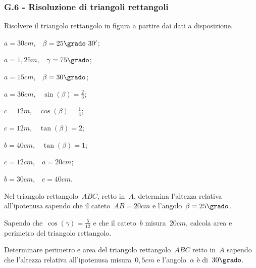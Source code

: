 \subsubsection*{G.6 - Risoluzione di triangoli rettangoli}

\begin{esercizio}
\label{ese:G.7}%
Risolvere il triangolo rettangolo in figura a partire dai dati a disposizione.
\begin{multicols}{2}
\begin{center}
 
\end{center}
\begin{enumeratea}
 \item $a=30\unit{cm}$,$\quad\beta=25\grado~30'$;
 \item $a=1,25\unit{m}$,$\quad\gamma=75\grado$;
 \item $a=15\unit{cm}$,$\quad\beta=30\grado$;
 \item $a=36\unit{cm}$,$\quad\sin(\beta)=\frac{2}{3}$;
 \item $c=12\unit{m}$,$\quad\cos(\beta)=\frac{1}{4}$;
 \item $c=12\unit{m}$,$\quad\tan(\beta)=2$;
 \item $b=40\unit{cm}$,$\quad\tan(\beta)=1$;
 \item $c=12\unit{cm}$,$\quad a=20\unit{cm}$;
 \item $b=30\unit{cm}$,$\quad c=40\unit{cm}$.
\end{enumeratea}
\end{multicols}
\end{esercizio}

\begin{esercizio}
\label{ese:G.8}
Nel triangolo rettangolo~$ABC$, retto in~$A$, determina l'altezza relativa all'ipotenusa sapendo che il cateto~${AB} = 20\unit{cm}$
e l'angolo~$\beta=25\grado$.
\end{esercizio}

\begin{esercizio}
\label{ese:G.9}
Sapendo che~$\cos(\gamma)=\frac{5}{12}$ e che il cateto~$b$ misura~$20\unit{cm}$, calcola area e perimetro del triangolo rettangolo.
\end{esercizio}

\begin{esercizio}
\label{ese:G.10}
Determinare perimetro e area del triangolo rettangolo~$ABC$ retto in~$A$ sapendo che l'altezza relativa all'ipotenusa misura~$0,5\unit{cm}$
e l'angolo~$\alpha$ è di~$30\grado$.
\end{esercizio}

